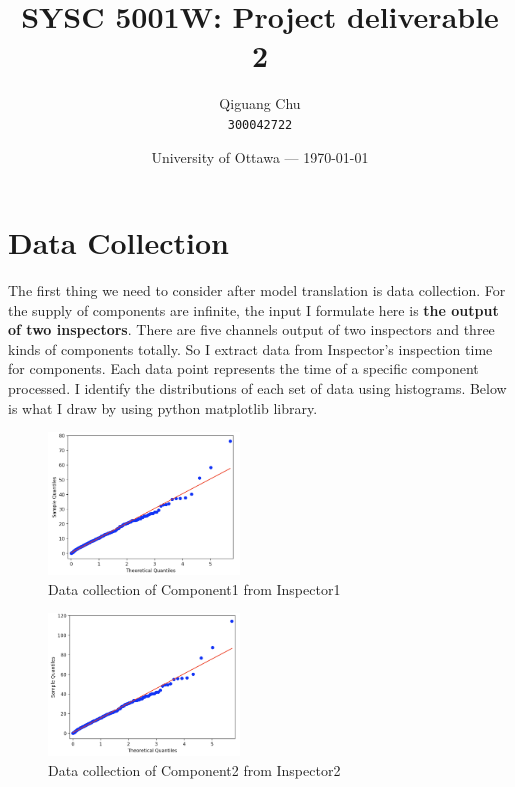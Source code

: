 \documentclass{article}
\title{SYSC 5001W: Project deliverable 2} %
\author{Qiguang Chu\\ \texttt{300042722}} %
\date{University of Ottawa --- \today} %
\begin{document}
\maketitle %

\section{Data Collection} %

The first thing we need to consider after model translation is data collection. For the supply of components are infinite,  the input I formulate here is \textbf{the output of two inspectors}. There are five channels output of two inspectors and three kinds of components totally. So I extract data from Inspector's inspection time for components. Each data point represents the time of a specific component processed. I identify the distributions of each set of data using histograms. Below is what I draw by using python matplotlib library.

\begin{figure}[htbp]
\begin{center}
\includegraphics[width=2in]{hist1.png}
\caption{Data collection of Component1 from Inspector1}
\label{data1}
\end{center}
\end{figure}

\begin{figure}[htbp]
\begin{center}
\includegraphics[width=2in]{hist2.png}
\caption{Data collection of Component2 from Inspector2}
\label{data2}
\end{center}
\end{figure}
\end{document}
